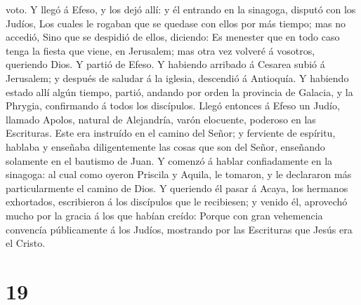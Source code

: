 voto.  Y llegó á Efeso, y los dejó allí: y él entrando en
la sinagoga, disputó con los Judíos,  Los cuales le
rogaban que se quedase con ellos por más tiempo; mas no accedió,
 Sino que se despidió de ellos, diciendo: Es menester que
en todo caso tenga la fiesta que viene, en Jerusalem; mas otra vez
volveré á vosotros, queriendo Dios. Y partió de Efeso.  Y
habiendo arribado á Cesarea subió á Jerusalem; y después de saludar á la
iglesia, descendió á Antioquía.  Y habiendo estado allí
algún tiempo, partió, andando por orden la provincia de Galacia, y la
Phrygia, confirmando á todos los discípulos.  Llegó
entonces á Efeso un Judío, llamado Apolos, natural de Alejandría, varón
elocuente, poderoso en las Escrituras.  Este era
instruído en el camino del Señor; y ferviente de espíritu, hablaba y
enseñaba diligentemente las cosas que son del Señor, enseñando solamente
en el bautismo de Juan.  Y comenzó á hablar confiadamente
en la sinagoga: al cual como oyeron Priscila y Aquila, le tomaron, y le
declararon más particularmente el camino de Dios.  Y
queriendo él pasar á Acaya, los hermanos exhortados, escribieron á los
discípulos que le recibiesen; y venido él, aprovechó mucho por la gracia
á los que habían creído:  Porque con gran vehemencia
convencía públicamente á los Judíos, mostrando por las Escrituras que
Jesús era el Cristo.

\hypertarget{section-18}{%
\section{19}\label{section-18}}

